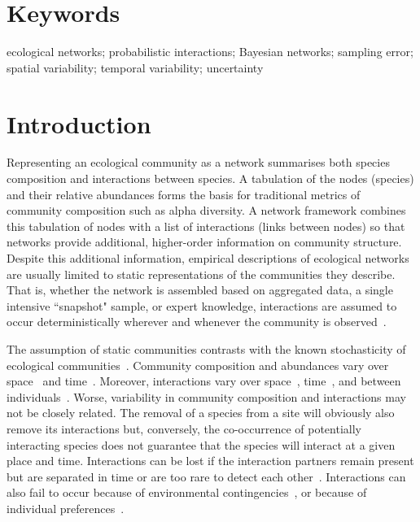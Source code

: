 \documentclass[12pt]{article}
\begin{document}
\begin{spacing}{2.0}
\section*{\small Keywords}

ecological networks; probabilistic interactions; Bayesian networks; sampling error; spatial variability; temporal variability; uncertainty

\linenumbers
\clearpage

\section*{Introduction}

    Representing an ecological community as a network summarises both species composition and interactions between species. A tabulation of the nodes (species) and their relative abundances forms the basis for traditional metrics of community composition such as alpha diversity. A network framework combines this tabulation of nodes with a list of interactions (links between nodes) so that networks provide additional, higher-order information on community structure. Despite this additional information, empirical descriptions of ecological networks are usually limited to static representations of the communities they describe. That is, whether the network is assembled based on aggregated data, a single intensive ``snapshot" sample, or expert knowledge, interactions are assumed to occur deterministically wherever and whenever the community is observed~\citep{Olesen2011a}. 


    The assumption of static communities contrasts with the known stochasticity of ecological communities~\citep{Gotelli2000}. Community composition and abundances vary over space~\citep{Baiser2012} and time~\citep{Olesen2011a}. Moreover, interactions vary over space~\citep{Kitching1987,Baiser2012}, time~\citep{Kitching1987,Olesen2011a}, and between individuals~\citep{Pires2011a,Fodrie2015,Novak2015}. Worse, variability in community composition and interactions may not be closely related. The removal of a species from a site will obviously also remove its interactions but, conversely, the co-occurrence of potentially interacting species does not guarantee that the species will interact at a given place and time. Interactions can be lost if the interaction partners remain present but are separated in time or are too rare to detect each other~\citep{Tylianakis2010}. Interactions can also fail to occur because of environmental contingencies~\citep{Poisot2015}, or because of individual preferences~\citep{Fodrie2015}. 



\end{spacing}
\end{document}
